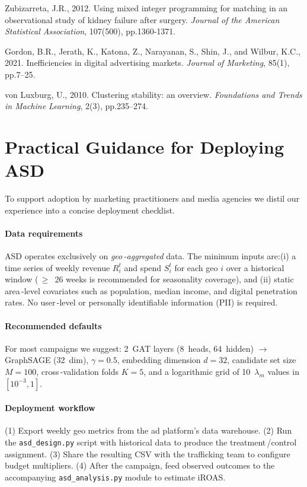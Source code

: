 \documentclass[final,3p,fleqn, 10pt]{elsarticle}
\begin{document}
\begin{thebibliography}{99}
Zubizarreta, J.R., 2012. Using mixed integer programming for matching in an observational study of kidney failure after surgery. \textit{Journal of the American Statistical Association}, 107(500), pp.1360-1371.

Gordon, B.R., Jerath, K., Katona, Z., Narayanan, S., Shin, J., and Wilbur, K.C., 2021. Inefficiencies in digital advertising markets. \textit{Journal of Marketing}, 85(1), pp.7--25.

von Luxburg, U., 2010. Clustering stability: an overview. \textit{Foundations and Trends in Machine Learning}, 2(3), pp.235--274.

\end{thebibliography}


\appendix
\section{Practical Guidance for Deploying ASD}\label{sec:practical}
To support adoption by marketing practitioners and media agencies we distil our experience into a concise deployment checklist.

\paragraph{Data requirements} ASD operates exclusively on \emph{geo\,-aggregated} data. The minimum inputs are:(i) a time series of weekly revenue $R_i^t$ and spend $S_i^t$ for each geo $i$ over a historical window (\,$\geq$~26 weeks is recommended for seasonality coverage), and (ii) static area\,-level covariates such as population, median income, and digital penetration rates. No user\,-level or personally identifiable information (PII) is required.

\paragraph{Recommended defaults} For most campaigns we suggest: 2~GAT layers (8~heads, 64~hidden) $\rightarrow$ GraphSAGE (32~dim), $\gamma=0.5$, embedding dimension $d=32$, candidate set size $M=100$, cross\,-validation folds $K=5$, and a logarithmic grid of 10~$\lambda_m$ values in $[10^{-3},1]$.

\paragraph{Deployment workflow} (1) Export weekly geo metrics from the ad platform's data warehouse. (2) Run the \texttt{asd\_design.py} script with historical data to produce the treatment\,/control assignment. (3) Share the resulting CSV with the trafficking team to configure budget multipliers. (4) After the campaign, feed observed outcomes to the accompanying \texttt{asd\_analysis.py} module to estimate iROAS.
\end{document}

